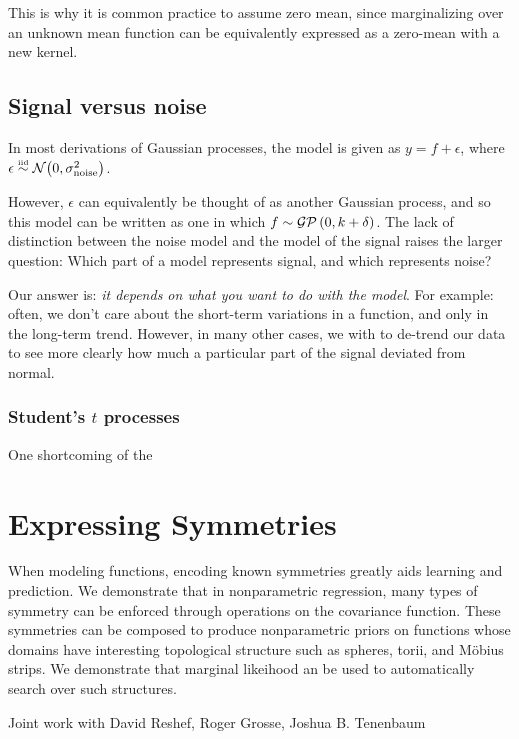 This is why it is common practice to assume zero mean, since marginalizing over an unknown mean function can be equivalently expressed as a zero-mean \gp{} with a new kernel.




\subsection{Signal versus noise}

In most derivations of Gaussian processes, the model is given as $y = f + \epsilon$, where $\epsilon \overset{\mbox{\tiny iid}}{\sim} \mathcal{N}\!\left(0,\sigma^2_{\textnormal{noise}}\right)$.

However, $\epsilon$ can equivalently be thought of as another Gaussian process, and so this model can be written as one in which $f \sim \mathcal{GP}\left(0, k + \delta \right)$.  The lack of distinction between the noise model and the model of the signal raises the larger question:  Which part of a model represents signal, and which represents noise?

Our answer is: \emph{it depends on what you want to do with the model}.  For example: often, we don't care about the short-term variations in a function, and only in the long-term trend.  However, in many other cases, we with to de-trend our data to see more clearly how much a particular part of the signal deviated from normal.

\subsubsection{Student's $t$ processes}

One shortcoming of the




\section{Expressing Symmetries}


When modeling functions, encoding known symmetries greatly aids learning and prediction.  We demonstrate that in nonparametric regression, many types of symmetry can be enforced through operations on the covariance function.  These symmetries can be composed to produce nonparametric priors on functions whose domains have interesting topological structure such as spheres, torii, and M\"{o}bius strips.  We demonstrate that marginal likeihood an be used to automatically search over such structures.

Joint work with David Reshef, Roger Grosse, Joshua B. Tenenbaum



